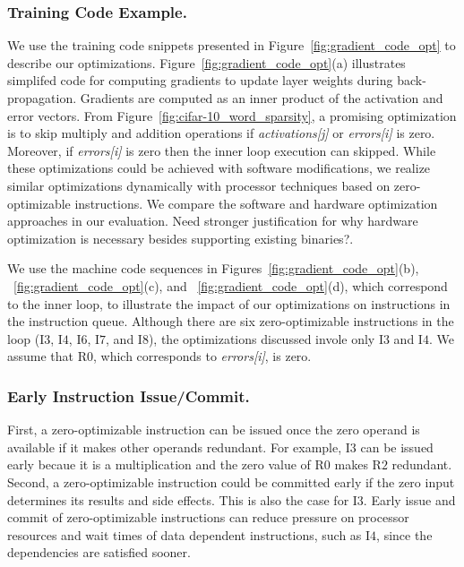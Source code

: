 \subsubsection{Training Code Example.}
We use the training code snippets presented in Figure~\ref{fig:gradient_code_opt} to describe our optimizations.  Figure~\ref{fig:gradient_code_opt}(a) illustrates simplifed code for computing gradients to update layer weights during back-propagation. Gradients are computed as an inner product of the activation and error vectors. From Figure~\ref{fig:cifar-10_word_sparsity}, a promising optimization is to skip multiply and addition operations if \emph{activations[j]} or \emph{errors[i]} is zero. Moreover, if \emph{errors[i]} is zero then the inner loop execution can skipped. While these optimizations could be achieved with software modifications, we realize similar optimizations dynamically with processor techniques based on zero-optimizable instructions.  We compare the software and hardware optimization approaches in our evaluation. {\color{red} Need stronger justification for why hardware optimization is necessary besides supporting existing binaries?}.

We use the machine code sequences in Figures~\ref{fig:gradient_code_opt}(b), ~\ref{fig:gradient_code_opt}(c), and ~\ref{fig:gradient_code_opt}(d), which correspond to the inner loop, to illustrate the impact of our optimizations on instructions in the instruction queue.  Although there are six zero-optimizable instructions in the loop (I$3$, I$4$, I$6$, I$7$, and I$8$), the optimizations discussed invole only I$3$ and I$4$. We assume that R$0$, which corresponds to \emph{errors[i]}, is zero. 

\subsubsection{Early Instruction Issue/Commit.}  First, a zero-optimizable instruction can be issued once the zero operand is available if it makes other operands redundant.  For example, I$3$ can be issued early becaue it is a multiplication and the zero value of R$0$ makes R$2$ redundant.  Second, a zero-optimizable instruction could be committed early if the zero input determines its results and side effects. This is also the case for I$3$. Early issue and commit of zero-optimizable instructions can reduce pressure on processor resources and wait times of data dependent instructions, such as I$4$, since the dependencies are satisfied sooner. 

